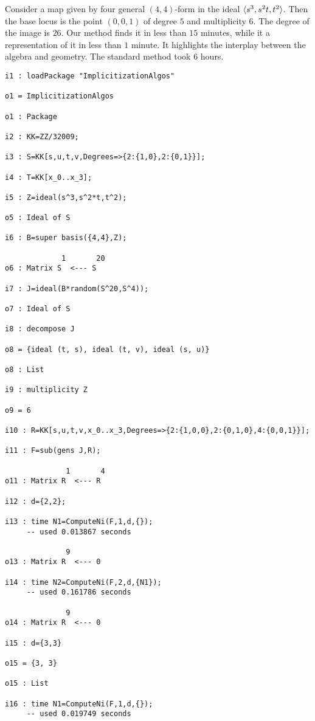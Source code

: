 \documentclass[fleqn,reqno]{amsart}
\numberwithin{first}{chapter}
\begin{document}
\begin{example}[$\mt{ex604}$]
\label{ex604}
Consider a map given by four general $(4,4)$-form in the ideal $\langle s^3,s^2t,t^2\rangle$.
Then the base locus is the point $(0,0,1)$ of degree $5$ and multiplicity $6$.
The degree of the image is $26$.
Our method finds it in less than $15$ minutes,
while it a representation of it in less than $1$ minute.
It highlights the interplay between the algebra and geometry.
The standard method took 6 hours.
\begin{verbatim}
i1 : loadPackage "ImplicitizationAlgos"

o1 = ImplicitizationAlgos

o1 : Package

i2 : KK=ZZ/32009;

i3 : S=KK[s,u,t,v,Degrees=>{2:{1,0},2:{0,1}}];

i4 : T=KK[x_0..x_3];

i5 : Z=ideal(s^3,s^2*t,t^2);

o5 : Ideal of S

i6 : B=super basis({4,4},Z);

             1       20
o6 : Matrix S  <--- S

i7 : J=ideal(B*random(S^20,S^4));

o7 : Ideal of S

i8 : decompose J

o8 = {ideal (t, s), ideal (t, v), ideal (s, u)}

o8 : List

i9 : multiplicity Z

o9 = 6

i10 : R=KK[s,u,t,v,x_0..x_3,Degrees=>{2:{1,0,0},2:{0,1,0},4:{0,0,1}}];

i11 : F=sub(gens J,R);

              1       4
o11 : Matrix R  <--- R

i12 : d={2,2};

i13 : time N1=ComputeNi(F,1,d,{});
     -- used 0.013867 seconds

              9
o13 : Matrix R  <--- 0

i14 : time N2=ComputeNi(F,2,d,{N1});
     -- used 0.161786 seconds

              9
o14 : Matrix R  <--- 0

i15 : d={3,3}

o15 = {3, 3}

o15 : List

i16 : time N1=ComputeNi(F,1,d,{});
     -- used 0.019749 seconds


\end{verbatim}
\end{example}
\end{document}
